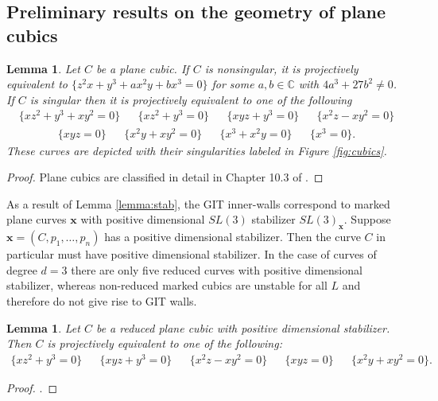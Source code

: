 \documentclass{amsart}
\newcommand{\C}{\mathbb{C}}
\numberwithin{equation}{section}
\newtheorem{lemma}[prop]{Lemma}
\theoremstyle{definition}
\begin{document}
 



\subsection{Preliminary results on the geometry of plane cubics} \label{sec:cubicgeom}

\begin{lemma}\label{lemma:classofcubics}
  Let $C$ be a plane cubic. If $C$ is nonsingular, it is projectively equivalent to $\{z^2x + y^3 + ax^2y + bx^3=0 \}$ for some $a,b \in \C$ with $4a^3 + 27b^2 \neq 0$. If $C$ is singular then it is projectively equivalent to one of the following 
\begin{align*}
\{xz^2 + y^3 + xy^2 =0 \} && \{xz^2 + y^3= 0\}  && \{xyz+y^3 = 0\} && \{x^2z - xy^2=0\}
\end{align*}
  \begin{align*}
  \{ xyz = 0\} && \{ x^2y + xy^2 =0\} && \{x^3 + x^2y=0  \} && \{x^3 = 0\}.    
  \end{align*}
  These curves are depicted with their singularities labeled in Figure \ref{fig:cubics}.
\end{lemma}

\begin{proof}
Plane cubics are classified in detail in Chapter 10.3 of \cite{Dol03} .
\end{proof}


As a result of Lemma \ref{lemma:stab}, the GIT inner-walls correspond to marked plane curves $\mathbf{x}$ with positive dimensional $SL(3)$ stabilizer $SL(3)_\mathbf{x}$. Suppose $\mathbf{x} = (C, p_1, \dots , p_n)$ has a positive dimensional stabilizer. Then the curve $C$ in particular must have positive dimensional stabilizer. In the case of curves of degree $d=3$ there are only five reduced curves with positive dimensional stabilizer, whereas non-reduced marked cubics are unstable for all $L$ and therefore do not give rise to GIT walls.


\begin{lemma}\label{lemma:CubicPositStbz}
 Let $C$ be a reduced plane cubic with positive dimensional stabilizer. Then $C$ is projectively equivalent to one of the following:  
 \begin{align*}
   \{xz^2 + y^3 =0\} &&  \{xyz+y^3 = 0\} && \{x^2z - xy^2 =0\} && \{xyz =0\} && \{x^2y+xy^2 = 0\}.
 \end{align*}
\end{lemma}

\begin{proof}
    \cite[Section 2]{Ple99}.
\end{proof}
\end{document}
